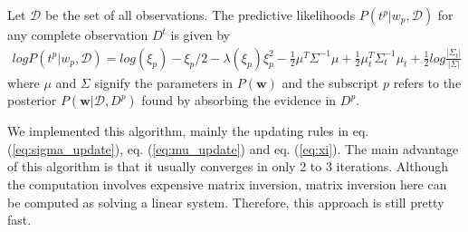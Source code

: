 Let $\mathcal{D}$ be the set of all observations. The predictive likelihoods $P(t^p | w_p, \mathcal{D})$ for any complete observation $D^t$ is given by
\begin{align}
  logP(t^p|w_p, \mathcal{D}) = log(\xi_p) - \xi_p/2 - \lambda(\xi_p)\xi_p^2 - \frac{1}{2}\mu^T\Sigma^{-1}\mu + \frac{1}{2}\mu^T_t\Sigma^{-1}_t\mu_t + \frac{1}{2}log\frac{|\Sigma_t|}{|\Sigma|}
\end{align}
where $\mu$ and $\Sigma$ signify the parameters in $P(\bm{w})$ and the subscript $p$ refers to the posterior $P(\bm{w}|\mathcal{D}, D^p)$ found by absorbing the evidence in $D^p$.

We implemented this algorithm, mainly the updating rules in eq. (\ref{eq:sigma_update}), eq. (\ref{eq:mu_update}) and eq. (\ref{eq:xi}). The main advantage of this algorithm is that it usually converges in only 2 to 3 iterations. Although the computation involves expensive matrix inversion, matrix inversion here can be computed as solving a linear system. Therefore, this approach is still pretty fast.


